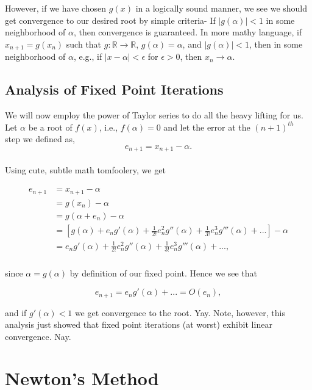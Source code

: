 \documentclass[paper=a4, fontsize=11pt]{scrartcl} %
\numberwithin{equation}{section} %
\numberwithin{figure}{section} %
\numberwithin{table}{section} %
\begin{document}
However, if we have chosen $g(x)$ in a logically sound manner, we see we should get convergence to our desired root by simple criteria- If $|g(\alpha)|<1$ in some neighborhood of $\alpha$, then convergence is guaranteed. In more mathy language, if $x_{n+1} = g(x_n)$ such that $g:\mathbb{R}\rightarrow\mathbb{R}$, $g(\alpha)=\alpha$, and $|g(\alpha)|<1$, then in some neighborhood of $\alpha$, e.g., if $|x-\alpha|<\epsilon$ for $\epsilon>0$, then $x_n\rightarrow\alpha$.\\

\subsection{Analysis of Fixed Point Iterations}

$ $\\

We will now employ the power of Taylor series to do all the heavy lifting for us. Let $\alpha$ be a root of $f(x)$, i.e., $f(\alpha)=0$ and let the error at the $(n+1)^{th}$ step we defined as, $$e_{n+1} = x_{n+1} - \alpha.$$\\
Using cute, subtle math tomfoolery, we get

\begin{align} 
\nonumber
\begin{split}
e_{n+1}&= x_{n+1} - \alpha \\
&= g(x_n) - \alpha \\
&=g(\alpha + e_n)  - \alpha \\
&=[g(\alpha) + e_n g'(\alpha) + \frac{1}{2!} e_n^2 g''(\alpha) + \frac{1}{3!} e_n^3 g'''(\alpha) + ... ] - \alpha \\
&= e_n g'(\alpha) + \frac{1}{2!} e_n^2 g''(\alpha) + \frac{1}{3!} e_n^3 g'''(\alpha) + ... , \\
\end{split}					
\end{align}

since $\alpha = g(\alpha)$ by definition of our fixed point. Hence we see that 

$$e_{n+1} = e_n g'(\alpha) + ... = O(e_n),$$

and if $g'(\alpha)<1$ we get convergence to the root. Yay. Note, however, this analysis just showed that fixed point iterations (at worst) exhibit linear convergence. Nay. \\

%
%
\section{Newton's Method}
\end{document}
